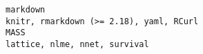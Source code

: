\documentclass[
  letterpaper,
  DIV=11,
  numbers=noendperiod]{scrreprt}
\begin{document}
\begin{verbatim}
markdown                                                                                                                                                                                                                                                                                                                                                                                                                                                                                                                                                                                                                                                                                                                                                                                                                                                                                                                                                                                                                                                                                                                                                                                                                                                              knitr, rmarkdown (>= 2.18), yaml, RCurl
MASS                                                                                                                                                                                                                                                                                                                                                                                                                                                                                                                                                                                                                                                                                                                                                                                                                                                                                                                                                                                                                                                                                                                                                                                                                                                                            lattice, nlme, nnet, survival

\end{verbatim}
\end{document}
